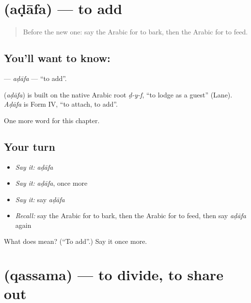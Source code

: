 \section[\texorpdfstring{\ar{أضاف} (aḍāfa)}{أضاف (aḍāfa)}]{ (aḍāfa) — to add}

\label{lesson:AR-C230-adafa}



\begin{quote}
Before the new one: say the Arabic for to bark, then the Arabic for to feed.
\end{quote}

\subsection*{You'll want to know: }
\textbf{} — \emph{aḍāfa} — \textquotedblleft{}to add\textquotedblright{}.

\begin{cousinweb}
\textbf{} (\emph{aḍāfa}) is built on the native Arabic root \emph{ḍ-y-f}, \textquotedblleft{}to lodge as a guest\textquotedblright{} (Lane). \emph{Aḍāfa} is Form IV, \textquotedblleft{}to attach, to add\textquotedblright{}.
\end{cousinweb}

\begin{grammarlens}[title={What you've built}]
One more word for this chapter.
\end{grammarlens}

\subsection*{Your turn}
\begin{itemize}
\raggedright
  \item \emph{Say it:} \emph{aḍāfa}
  \item \emph{Say it:} \emph{aḍāfa}, once more
  \item \emph{Say it:} say \emph{aḍāfa}
  \item \emph{Recall:} say the Arabic for to bark, then the Arabic for to feed, then say \emph{aḍāfa} again
\end{itemize}

\begin{tcolorbox}[breakable,colback=teal!4,colframe=teal!35!black,title={Before you move on}]
What does  mean? (\textquotedblleft{}To add\textquotedblright{}.) Say it once more.
\end{tcolorbox}
\section[\texorpdfstring{\ar{قسم} (qassama)}{قسم (qassama)}]{ (qassama) — to divide, to share out}

